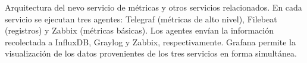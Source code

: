 \label{fig:metricas}
\captionStyle
Arquitectura del nevo servicio de métricas y otros servicios
relacionados. En cada servicio se ejecutan tres agentes: Telegraf
(métricas de alto nivel), Filebeat (registros) y Zabbix (métricas
básicas). Los agentes envían la información recolectada a InfluxDB,
Graylog y Zabbix, respectivamente. Grafana permite la visualización de
los datos provenientes de los tres servicios en forma simultánea.
